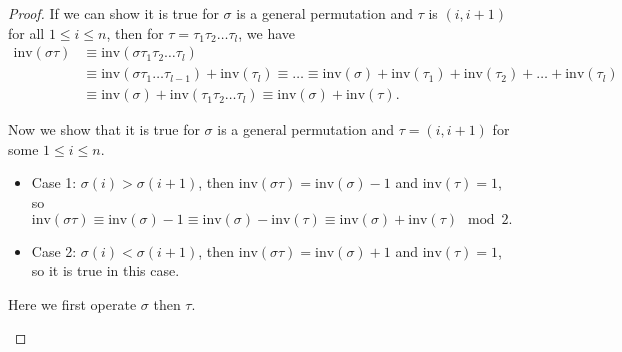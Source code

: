 \begin{proof}
    If we can show it is true for \(\sigma \) is a general permutation and \(\tau \) is \((i, i+1)\) for all \(1 \le i \le n\), then for \(\tau = \tau _1 \tau _2 \dots \tau _l\), we have 
    \begin{align*}
        \mathrm{inv}(\sigma \tau ) &\equiv  \mathrm{inv}(\sigma \tau _1 \tau _2 \dots \tau _l) \\
        &\equiv  \mathrm{inv}(\sigma \tau _1 \dots \tau _{l-1}) + \mathrm{inv}(\tau _l) \equiv \dots \equiv \mathrm{inv}(\sigma ) + \mathrm{inv}(\tau _1) + \mathrm{inv}(\tau _2) + \dots + \mathrm{inv}(\tau _l) \\
        &\equiv \mathrm{inv}(\sigma ) + \mathrm{inv}(\tau _1 \tau _2 \dots \tau _l) \equiv \mathrm{inv}(\sigma ) + \mathrm{inv}(\tau ).          
    \end{align*}   

    Now we show that it is true for \(\sigma \) is a general permutation and \(\tau = (i, i+1)\) for some \(1 \le i \le n\).
    \begin{itemize}
        \item Case 1: \(\sigma (i) > \sigma (i+1)\), then \(\mathrm{inv}(\sigma \tau ) = \mathrm{inv}(\sigma ) - 1  \) and \(\mathrm{inv}(\tau ) = 1 \), so 
        \[
            \mathrm{inv}(\sigma \tau ) \equiv \mathrm{inv}(\sigma ) - 1 \equiv \mathrm{inv}(\sigma ) - \mathrm{inv}(\tau ) \equiv \mathrm{inv}(\sigma ) + \mathrm{inv}(\tau ) \mod{2}.      
        \]   
        \item Case 2: \(\sigma (i) < \sigma (i+1)\), then \(\mathrm{inv}(\sigma \tau ) = \mathrm{inv}(\sigma ) + 1  \) and \(\mathrm{inv}(\tau ) = 1 \), so it is true in this case.   
    \end{itemize}   
    \begin{note}
        Here we first operate \(\sigma \) then \(\tau \).  
    \end{note}
\end{proof}

